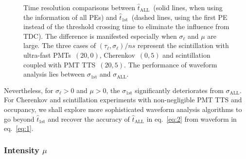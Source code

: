 \begin{figure}[H]
  \centering
  \resizebox{1.0\textwidth}{!}{}
  \caption{\label{fig:reso-diff} Time resolution comparisons between $\hat{t}_{\mathrm{ALL}}$~(solid lines, when using the information of all PEs) and $\hat{t}_\mathrm{1st}$~(dashed lines, using the first PE instead of the threshold crossing time to eliminate the influence from TDC).  The difference is manifested especially when $\sigma_\ell$ and $\mu$ are large. The three cases of $(\tau_\ell, \sigma_\ell)/\si{ns}$ represent the scintillation with ultra-fast PMTs~$(20, 0)$, Cherenkov~$(0, 5)$ and scintillation coupled with PMT TTS~$(20, 5)$. The performance of waveform analysis lies between $\sigma_{\mathrm{1st}}$ and $\sigma_{\mathrm{ALL}}$. }
\end{figure}

Nevertheless, for $\sigma_\ell > 0$ and $\mu >0$, the $\sigma_{\mathrm{1st}}$ significantly deteriorates from $\sigma_{\mathrm{ALL}}$.  For Cherenkov and scintillation experiments with non-negligible PMT TTS and occupancy, we shall explore more sophisticated waveform analysis algorithms to go beyond $\hat{t}_{\mathrm{1st}}$ and recover the accuracy of $\hat{t}_\mathrm{ALL}$ in eq.~\eqref{eq:2} from waveform in eq.~\eqref{eq:1}.

\subsubsection{Intensity $\mu$}
\label{sec:intensity-mu}

